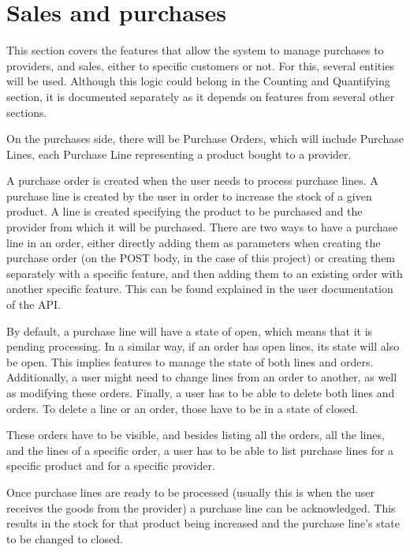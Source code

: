 \section{Sales and purchases}
This section covers the features that allow the system to manage purchases to providers, and sales, either to specific customers or not. For this, several entities will be used. Although this logic could belong in the Counting and Quantifying section, it is documented separately as it depends on features from several other sections. 

On the purchases side, there will be Purchase Orders, which will include Purchase Lines, each Purchase Line representing a product bought to a provider.

A purchase order is created when the user needs to process purchase lines. A purchase line is created by the user in order to increase the stock of a given product. A line is created specifying the product to be purchased and the provider from which it will be purchased. There are two ways to have a purchase line in an order, either directly adding them as parameters when creating the purchase order (on the POST body, in the case of this project) or creating them separately with a specific feature, and then adding them to an existing order with another specific feature. This can be found explained in the user documentation of the API.

By default, a purchase line will have a state of open, which means that it is pending processing. In a similar way, if an order has open lines, its state will also be open. This implies features to manage the state of both lines and orders. Additionally, a user might need to change lines from an order to another, as well as modifying these orders. Finally, a user has to be able to delete both lines and orders. To delete a line or an order, those have to be in a state of closed.

These orders have to be visible, and besides listing all the orders, all the lines, and the lines of a specific order, a user has to be able to list purchase lines for a specific product and for a specific provider.

Once purchase lines are ready to be processed (usually this is when the user receives the goods from the provider) a purchase line can be acknowledged. This results in the stock for that product being increased and the purchase line’s state to be changed to closed.

